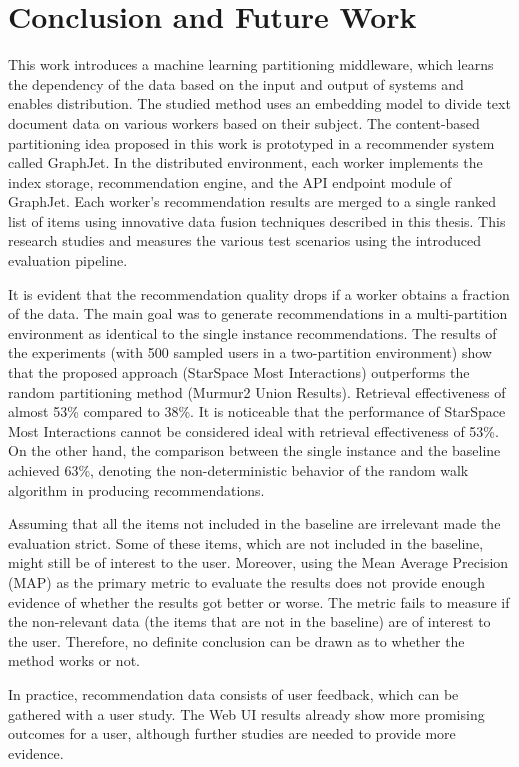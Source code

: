 \chapter{Conclusion and Future Work}
\label{chap:conclusion}
This work introduces a machine learning partitioning middleware, which learns the dependency of the data based on the input and output of systems and enables distribution. The studied method uses an embedding model to divide text document data on various workers based on their subject. The content-based partitioning idea proposed in this work is prototyped in a recommender system called GraphJet. In the distributed environment, each worker implements the index storage, recommendation engine, and the API endpoint module of GraphJet. Each worker's recommendation results are merged to a single ranked list of items using innovative data fusion techniques described in this thesis. This research studies and measures the various test scenarios using the introduced evaluation pipeline.


It is evident that the recommendation quality drops if a worker obtains a fraction of the data. The main goal was to generate recommendations in a multi-partition environment as identical to the single instance recommendations. The results of the experiments (with 500 sampled users in a two-partition environment) show that the proposed approach (StarSpace Most Interactions) outperforms the random partitioning method (Murmur2 Union Results). Retrieval effectiveness of almost 53\% compared to 38\%. It is noticeable that the performance of StarSpace Most Interactions cannot be considered ideal with retrieval effectiveness of 53\%. On the other hand, the comparison between the single instance and the baseline achieved 63\%, denoting the non-deterministic behavior of the random walk algorithm in producing recommendations.


Assuming that all the items not included in the baseline are irrelevant made the evaluation strict. Some of these items, which are not included in the baseline, might still be of interest to the user. Moreover, using the Mean Average Precision (MAP) as the primary metric to evaluate the results does not provide enough evidence of whether the results got better or worse. The metric fails to measure if the non-relevant data (the items that are not in the baseline) are of interest to the user. Therefore, no definite conclusion can be drawn as to whether the method works or not. 


In practice, recommendation data consists of user feedback, which can be gathered with a user study. The Web UI results already show more promising outcomes for a user, although further studies are needed to provide more evidence. 


